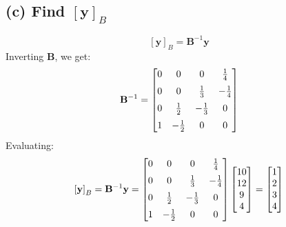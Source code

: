 \documentclass{article}
\begin{document}
\subsection{(c) Find $ \left[ \mathbf{y} \right]_{B} $} 
\[%
    \left[ \mathbf{y} \right]_{B} = \mathbf{B}^{-1}\mathbf{y}
\]%
Inverting $ \mathbf{B} $, we get:
\[%
    \mathbf{B}^{-1} = 
    \begin{bmatrix}
        0 & 0 & 0 & \frac{1}{4}  \vspace{2mm}\\ 
        0 & 0 & \frac{1}{3}  & -\frac{1}{4} \vspace{2mm} \\ 
		0 & \frac{1}{2}  & -\frac{1}{3}  & 0 \vspace{2mm} \\ 
		1 & -\frac{1}{2}  & 0 & 0 \\		
    \end{bmatrix}
\]%
Evaluating:
\[%
    \left[ \mathbf{y} \right]_{B} = \mathbf{B}^{-1}\mathbf{y} 
    =
    \begin{bmatrix}
        0 & 0 & 0 & \frac{1}{4}  \vspace{2mm}\\ 
        0 & 0 & \frac{1}{3}  & -\frac{1}{4} \vspace{2mm} \\ 
		0 & \frac{1}{2}  & -\frac{1}{3}  & 0 \vspace{2mm} \\ 
		1 & -\frac{1}{2}  & 0 & 0 \\		
    \end{bmatrix}
    \begin{bmatrix}
        10 \\		
        12 \\
		9 \\
		4 \\
    \end{bmatrix} 
    =
    \begin{bmatrix}
        1 \\		
        2 \\
		3 \\
		4 \\
    \end{bmatrix} 
\]%
\end{document}
